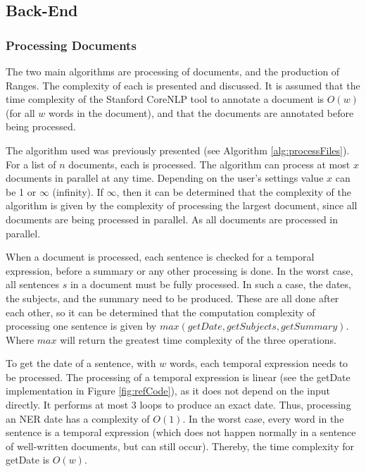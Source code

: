 \subsection{Back-End}
\subsubsection{Processing Documents}
\par The two main algorithms are processing of documents, and the production of Ranges. The complexity of each is presented and discussed. It is assumed that the time complexity of the Stanford CoreNLP tool to annotate a document is $O(w)$ (for all $w$ words in the document), and that the documents are annotated before being processed.

\par The algorithm used was previously presented (see Algorithm \ref{alg:processFiles}). For a list of $n$ documents, each is processed. The algorithm can process at most $x$ documents in parallel at any time. Depending on the user's settings value $x$ can be 1 or $\infty$ (infinity). If $\infty$, then it can be determined that the complexity of the algorithm is given by the complexity of processing the largest document, since all documents are being processed in parallel. As all documents are processed in parallel. 

\par When a document is processed, each sentence is checked for a temporal expression, before a summary or any other processing is done. In the worst case, all sentences $s$ in a document must be fully processed. In such a case, the dates, the subjects, and the summary need to be produced. These are all done after each other, so it can be determined that the computation complexity of processing one sentence is given by $max(getDate, getSubjects, getSummary)$. Where $max$ will return the greatest time complexity of the three operations. 

\par To get the date of a sentence, with $w$ words, each temporal expression needs to be processed. The processing of a temporal expression is linear (see the getDate implementation in Figure \ref{fig:refCode}), as it does not depend on the input directly. It performs at most 3 loops to produce an exact date. Thus, processing an NER date has a complexity of $O(1)$. In the worst case, every word in the sentence is a temporal expression (which does not happen normally in a sentence of well-written documents, but can still occur). Thereby, the time complexity for getDate is $O(w)$.

